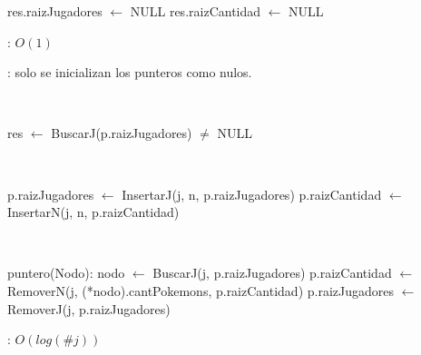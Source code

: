 \begin{Algoritmos}

	\begin{algorithm}[H]
		\NoCaptionOfAlgo
		\caption{}
		res.raizJugadores $\leftarrow$ NULL
		res.raizCantidad $\leftarrow$ NULL
	\end{algorithm}

	\complejidad: $O(1)$

	\justifcomp: solo se inicializan los punteros como nulos.

	~

	\begin{algorithm}[H]
		\NoCaptionOfAlgo
		\caption{}
		res $\leftarrow$ BuscarJ(p.raizJugadores) $\neq$ NULL
	\end{algorithm}

	~

	\begin{algorithm}[H]
		\NoCaptionOfAlgo
		\caption{}
		p.raizJugadores $\leftarrow$ InsertarJ(j, n, p.raizJugadores)
		p.raizCantidad $\leftarrow$ InsertarN(j, n, p.raizCantidad)
	\end{algorithm}

	~

	\begin{algorithm}[H]
		\NoCaptionOfAlgo
		\caption{}
		puntero(Nodo): nodo $\leftarrow$ BuscarJ(j, p.raizJugadores)
		p.raizCantidad $\leftarrow$ RemoverN(j, (*nodo).cantPokemons, p.raizCantidad)
		p.raizJugadores $\leftarrow$ RemoverJ(j, p.raizJugadores)
	\end{algorithm}

	\complejidad: $O(log(\#j))$


\end{Algoritmos}
